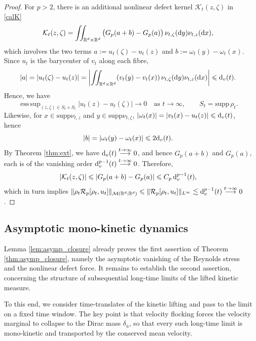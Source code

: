 \documentclass[10pt,reqno]{amsart}
\DeclareMathOperator*{\esssup}{ess\,sup}
\renewcommand{\leq}{\leqslant}
\renewcommand{\le}{\leqslant}
\numberwithin{equation}{section}
\newcommand{\R}{\mathbb R}
\newcommand{\lt}{\left}
\newcommand{\rt}{\right}
\newcommand{\intrr}{\iint_{\R^d \times \R^d}}
\newcommand{\calK}{\mathcal K}
\newcommand{\calM}{\mathcal M}
\newcommand{\calR}{\mathcal R}
\newcommand{\rd}{\textnormal{d}}
\newcommand{\dx}{\textnormal{d}x}
\newcommand{\dy}{\textnormal{d}y}
\newcommand{\supp}{\text{supp}}
\begin{document}
\begin{proof}
For $p>2$, there is an additional nonlinear defect  kernel $\calK_t(z,\zeta)$ in \eqref{calK} 
\[
\calK_t(z,\zeta) =\intrr \big(G_p(a+b)-G_p(a)\big)\,\nu_{t,\zeta}(\dy) \nu_{t,z}(\dx),
\]
which involves the two terms  $a:=u_t(\zeta)-u_t(z)$ and $b:=\omega_t(y)-\omega_t(x)$. Since $u_t$ is the barycenter of $v_t$ along each fibre,
\[
|a| =|u_t(\zeta)-u_t(z)| =\lt|\intrr (v_t(y)-v_t(x))\,\nu_{t,\zeta}(\dy) \nu_{t,z}(\dx)\rt|
\le \rd_v(t).
\]
Hence, we have
\[
\esssup_{(z,\zeta)\in S_t\times S_t}|u_t(z)-u_t(\zeta)|
\to 0 \quad \text{as }t\to\infty, \qquad S_t=\text{supp}\,\rho_t.
\]
Likewise, for $x\in\supp\nu_{t,z}$ and $y\in\supp\nu_{t,\zeta}$, $|\omega_t(x)| = |v_t(x)-u_t(z)| \le \rd_v(t)$, hence
\[
|b| = |\omega_t(y)-\omega_t(x)| \le 2\rd_v(t).
\]
By Theorem \ref{thm:ext}, we have  $\rd_v(t)\stackrel{t\rightarrow\infty}{\longrightarrow}0$, and hence $G_p(a+b)$ and $G_p(a)$, each is of the vanishing order $\rd_v^{p-1}(t)\stackrel{t\rightarrow \infty}{\longrightarrow}0$. Therefore, 
\[
|\calK_t(z,\zeta)| \le|G_p(a+b)-G_p(a)| \le C_p\, \rd_v^{p-1}(t),
\]
 which in turn implies
$\displaystyle 
\|\rho_t\calR_p[\rho_t,u_t]\|_{\calM(\R^d;\R^d)}\leq \|\calR_p[\rho_t,u_t]\|_{L^\infty} \lesssim \rd_v^{p-1}(t)\stackrel{t\rightarrow \infty}{\longrightarrow}0$.
\end{proof}
 
%
%
%                      
%
%

 
\subsection{Asymptotic mono-kinetic dynamics}

Lemma \ref{lem:asymp_closure} already proves the first assertion of Theorem \ref{thm:asymp_closure}, namely the asymptotic vanishing of the Reynolds stress and the nonlinear defect force. It remains to establish the second assertion, concerning the structure of subsequential long-time limits of the lifted kinetic measure.

To this end, we consider time-translates of the kinetic lifting and pass to the limit on a fixed time window. The key point is that velocity flocking forces the velocity marginal to collapse to the Dirac mass $\delta_{\bar u}$, so that every such long-time limit is mono-kinetic and transported by the conserved mean velocity.
\end{document}
